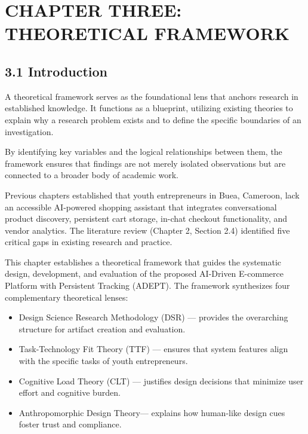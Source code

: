 \documentclass[12pt,a4paper]{article}
\begin{document}
\newpage

\section{CHAPTER THREE: THEORETICAL FRAMEWORK}

\subsection{3.1 Introduction}

A theoretical framework serves as the foundational lens that anchors research in established knowledge. It functions as a blueprint, utilizing existing theories to explain why a research problem exists and to define the specific boundaries of an investigation.

By identifying key variables and the logical relationships between them, the framework ensures that findings are not merely isolated observations but are connected to a broader body of academic work.

Previous chapters established that youth entrepreneurs in Buea, Cameroon, lack an accessible AI-powered shopping assistant that integrates conversational product discovery, persistent cart storage, in-chat checkout functionality, and vendor analytics. The literature review (Chapter 2, Section 2.4) identified five critical gaps in existing research and practice.

This chapter establishes a theoretical framework that guides the systematic design, development, and evaluation of the proposed AI-Driven E-commerce Platform with Persistent Tracking (ADEPT). The framework synthesizes four complementary theoretical lenses:

\begin{itemize}
    \item Design Science Research Methodology (DSR) --- provides the overarching structure for artifact creation and evaluation.
    \item Task-Technology Fit Theory (TTF) --- ensures that system features align with the specific tasks of youth entrepreneurs.
    \item Cognitive Load Theory (CLT) --- justifies design decisions that minimize user effort and cognitive burden.
    \item Anthropomorphic Design Theory--- explains how human-like design cues foster trust and compliance.
\end{itemize}
\end{document}
